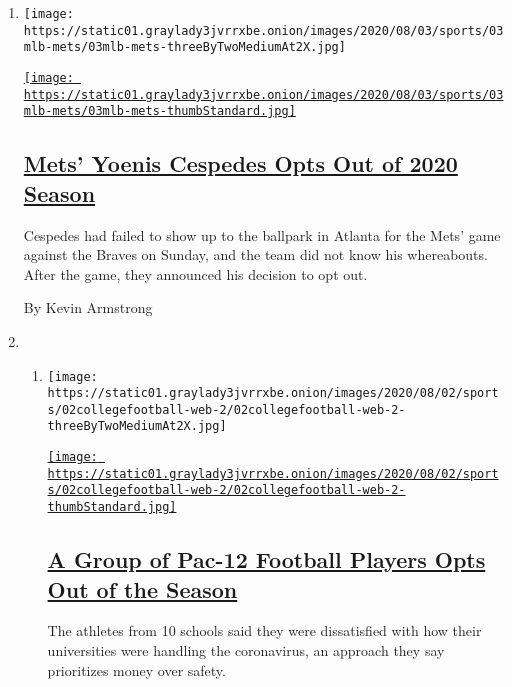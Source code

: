 \begin{enumerate}
\def\labelenumi{\arabic{enumi}.}
\item
  \texttt{[image: https://static01.graylady3jvrrxbe.onion/images/2020/08/03/sports/03mlb-mets/03mlb-mets-threeByTwoMediumAt2X.jpg]}

  \href{/2020/08/02/sports/baseball/Yoenis-cespedes-opt-out-rule.html}{\texttt{[image: https://static01.graylady3jvrrxbe.onion/images/2020/08/03/sports/03mlb-mets/03mlb-mets-thumbStandard.jpg]}}

  \hypertarget{mets-yoenis-cespedes-opts-out-of-2020-season}{%
  \subsection{\texorpdfstring{\href{/2020/08/02/sports/baseball/Yoenis-cespedes-opt-out-rule.html}{Mets'
  Yoenis Cespedes Opts Out of 2020
  Season}}{Mets' Yoenis Cespedes Opts Out of 2020 Season}}\label{mets-yoenis-cespedes-opts-out-of-2020-season}}

  Cespedes had failed to show up to the ballpark in Atlanta for the
  Mets' game against the Braves on Sunday, and the team did not know his
  whereabouts. After the game, they announced his decision to opt out.

  By Kevin Armstrong
\item
  \begin{enumerate}
  \def\labelenumii{\arabic{enumii}.}
  \item
    \texttt{[image: https://static01.graylady3jvrrxbe.onion/images/2020/08/02/sports/02collegefootball-web-2/02collegefootball-web-2-threeByTwoMediumAt2X.jpg]}

    \href{/2020/08/02/sports/ncaafootball/coronavirus-college-football-pac-12.html}{\texttt{[image: https://static01.graylady3jvrrxbe.onion/images/2020/08/02/sports/02collegefootball-web-2/02collegefootball-web-2-thumbStandard.jpg]}}

    \hypertarget{a-group-of-pac-12-football-players-opts-out-of-the-season}{%
    \subsection{\texorpdfstring{\href{/2020/08/02/sports/ncaafootball/coronavirus-college-football-pac-12.html}{A
    Group of Pac-12 Football Players Opts Out of the
    Season}}{A Group of Pac-12 Football Players Opts Out of the Season}}\label{a-group-of-pac-12-football-players-opts-out-of-the-season}}

    The athletes from 10 schools said they were dissatisfied with how
    their universities were handling the coronavirus, an approach they
    say prioritizes money over safety.


\end{enumerate}
\end{enumerate}

